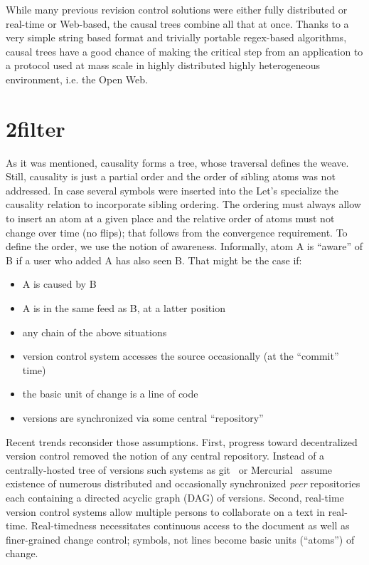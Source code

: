 \documentclass{acm_proc_article-sp}
\begin{document}
While many previous revision control solutions were either
fully distributed or real-time or Web-based, the causal trees
combine all that at once. Thanks to a very simple string based
format and trivially portable regex-based algorithms, causal trees
have a good chance of making the critical step from an
application to a protocol used at mass scale in highly
distributed highly heterogeneous environment, i.e. the Open Web.


\section{2filter}

As it was mentioned, causality forms a tree, whose traversal
defines the weave. Still, causality is just a partial order
and the order of sibling atoms was not addressed. In case
several symbols were inserted into the 
Let's specialize the causality relation to incorporate sibling
ordering.
The ordering must always allow to insert an atom at a given
place and the relative order of atoms must not change over time
(no flips); that follows from the convergence requirement.
To define the order, we use the notion of awareness. 
   Informally, atom A is ``aware'' of B if a user who added A has
   also seen B. That might be the case if:
   \begin{itemize}
     \item A is caused by B
     \item A is in the same feed as B, at a latter position
     \item any chain of the above situations
   \end{itemize}




\begin{itemize}
\item version control system accesses the source occasionally (at the ``commit'' time)
\item the basic unit of change is a line of code
\item versions are synchronized via some central ``repository''
\end{itemize}
Recent trends reconsider those assumptions.
First, progress toward decentralized version control removed the notion of any central repository. Instead of a centrally-hosted tree of versions such systems as git~\cite{git} or Mercurial~\cite{mercurial} assume existence of numerous distributed and occasionally synchronized \emph{peer} repositories each containing a directed acyclic graph (DAG) of versions.
Second, real-time version control systems allow multiple persons to collaborate on a text in real-time. Real-timedness necessitates continuous access to the document as well as finer-grained change control;  symbols, not lines become basic units (``atoms'') of change.
\end{document}
